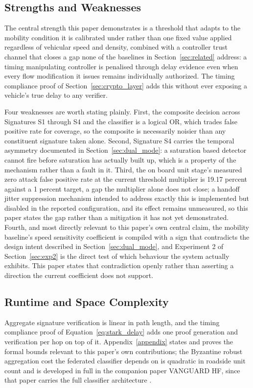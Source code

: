 \documentclass[final,5p,twocolumn]{elsarticle}
\theoremstyle{remark}
\theoremstyle{plain}
\begin{document}
\subsection{Strengths and Weaknesses}
The central strength this paper demonstrates is a threshold that adapts to
the mobility condition it is calibrated under rather than one fixed value
applied regardless of vehicular speed and density, combined with a
controller trust channel that closes a gap none of the baselines in
Section~\ref{sec:related} address: a timing manipulating controller is
penalised through delay evidence even when every flow modification it
issues remains individually authorized. The timing compliance proof of
Section~\ref{sec:crypto_layer} adds this without ever exposing a vehicle's
true delay to any verifier.

Four weaknesses are worth stating plainly. First, the composite decision
across Signatures S1 through S4 and the classifier is a logical OR, which
trades false positive rate for coverage, so the composite is necessarily
noisier than any constituent signature taken alone. Second, Signature S4
carries the temporal asymmetry documented in Section~\ref{sec:dual_mode}: a
saturation based detector cannot fire before saturation has actually built
up, which is a property of the mechanism rather than a fault in it. Third,
the on board unit stage's measured zero attack false positive rate at the
current threshold multiplier is 19.17 percent against a 1 percent target,
a gap the multiplier alone does not close; a handoff jitter suppression
mechanism intended to address exactly this is implemented but disabled in
the reported configuration, and its effect remains unmeasured, so this
paper states the gap rather than a mitigation it has not yet demonstrated.
Fourth, and most directly relevant to this paper's own central claim, the
mobility baseline's speed sensitivity coefficient is compiled with a sign
that contradicts the design intent described in
Section~\ref{sec:dual_mode}, and Experiment 2 of
Section~\ref{sec:exp2} is the direct test of which behaviour the system
actually exhibits. This paper states that contradiction openly rather than
asserting a direction the current coefficient does not support.

\subsection{Runtime and Space Complexity}
Aggregate signature verification is linear in path length, and the timing
compliance proof of Equation~\eqref{eq:stark_delay} adds one proof
generation and verification per hop on top of it. Appendix~\ref{appendix}
states and proves the formal bounds relevant to this paper's own
contributions; the Byzantine robust aggregation cost the federated
classifier depends on is quadratic in roadside unit count and is developed
in full in the companion paper VANGUARD HF, since that paper carries the
full classifier architecture \cite{VanguardHF2026}.
\end{document}
